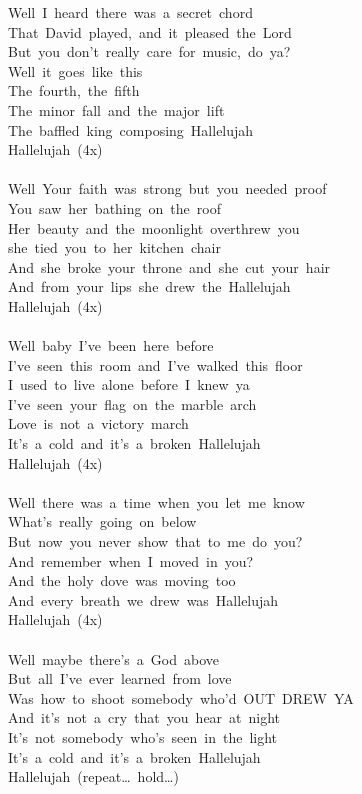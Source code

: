 \documentclass[]{book}
\begin{document}
Well~I~heard~there~was~a~secret~chord~\\
That~David~played,~and~it~pleased~the~Lord~\\
But~you~don't~really~care~for~music,~do~ya?~\\
Well~it~goes~like~this~\\
The~fourth,~the~fifth~\\
The~minor~fall~and~the~major~lift~\\
The~baffled~king~composing~Hallelujah~\\
Hallelujah~(4x)\\
~\\
Well~Your~faith~was~strong~but~you~needed~proof~\\
You~saw~her~bathing~on~the~roof~\\
Her~beauty~and~the~moonlight~overthrew~you~\\
she~tied~you~to~her~kitchen~chair~\\
And~she~broke~your~throne~and~she~cut~your~hair~\\
And~from~your~lips~she~drew~the~Hallelujah~\\
Hallelujah~(4x)\\
~\\
Well~baby~I've~been~here~before\\
I've~seen~this~room~and~I've~walked~this~floor\\
I~used~to~live~alone~before~I~knew~ya~\\
I've~seen~your~flag~on~the~marble~arch\\
Love~is~not~a~victory~march~\\
It's~a~cold~and~it's~a~broken~Hallelujah~\\
Hallelujah~(4x)\\
~\\
Well~there~was~a~time~when~you~let~me~know\\
What's~really~going~on~below\\
But~now~you~never~show~that~to~me~do~you?\\
And~remember~when~I~moved~in~you?\\
And~the~holy~dove~was~moving~too\\
And~every~breath~we~drew~was~Hallelujah\\
Hallelujah~(4x)\\
~\\
Well~maybe~there's~a~God~above\\
But~all~I've~ever~learned~from~love\\
Was~how~to~shoot~somebody~who'd~OUT~DREW~YA\\
And~it's~not~a~cry~that~you~hear~at~night\\
It's~not~somebody~who's~seen~in~the~light\\
It's~a~cold~and~it's~a~broken~Hallelujah\\
Hallelujah~(repeat\ldots~hold\ldots)\\
~\\
\end{document}
